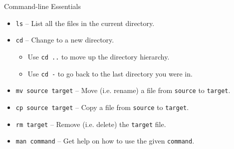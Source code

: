 \begin{frame}{Command-line Essentials}

 \begin{itemize}

  \item \texttt{ls} -- List all the files in the current directory.

  \item \texttt{cd} -- Change to a new directory.

  \begin{itemize}
   \item Use \texttt{cd ..} to move up the directory hierarchy.
   \item Use \texttt{cd -} to go back to the last directory you were in.
  \end{itemize}

  \item \texttt{mv source target} -- Move (i.e. rename) a file from 
   \texttt{source} to \texttt{target}.

  \item \texttt{cp source target} -- Copy a file from \texttt{source} to 
   \texttt{target}.

  \item \texttt{rm target} -- Remove (i.e. delete) the \texttt{target} file.

  \item \texttt{man command} -- Get help on how to use the given 
   \texttt{command}.

 \end{itemize}

\end{frame}

